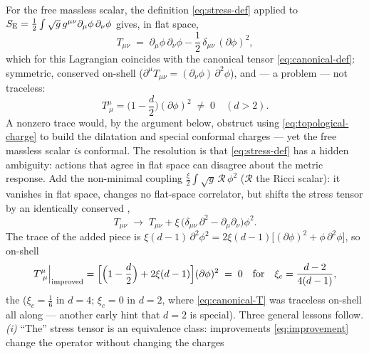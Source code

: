 \begin{eexample}
\label{ex:scalar-stress}
For the free massless scalar, the definition \eqref{eq:stress-def} applied to
$S_{\rm E} = \frac12\int \sqrt g\, g^{\mu\nu}\partial_\mu\phi\,\partial_\nu\phi$
gives, in flat space,
\begin{equation}
T_{\mu\nu} \;=\; \partial_\mu \phi\, \partial_\nu \phi
- \frac{1}{2}\,\delta_{\mu\nu}\, (\partial\phi)^2 ,
\label{eq:canonical-T}
\end{equation}
which for this Lagrangian coincides with the canonical tensor
\eqref{eq:canonical-def}: symmetric,
conserved on-shell ($\partial^\mu T_{\mu\nu} = (\partial_\nu \phi)\,
\partial^2\phi$), and --- a problem --- not traceless:
\begin{equation}
T^{\mu}_{\ \mu} = \Big(1 - \frac d2\Big)(\partial\phi)^2 \;\ne\; 0
\quad (d > 2).
\end{equation}
A nonzero trace would, by the argument below, obstruct using
\eqref{eq:topological-charge} to build the dilatation and special conformal
charges --- yet the free massless scalar \emph{is} conformal. The resolution
is that \eqref{eq:stress-def} has a hidden ambiguity: actions that agree in
flat space can disagree about the metric response. Add the non-minimal
coupling $\frac{\xi}{2} \int \sqrt g \, \mathcal{R}\, \phi^2$ ($\mathcal{R}$
the Ricci scalar): it vanishes in flat space, changes no flat-space
correlator, but shifts the stress tensor by an identically conserved
,
\begin{equation}
T_{\mu\nu} \;\longrightarrow\; T_{\mu\nu}
+ \xi \,\big(\delta_{\mu\nu}\,\partial^2 - \partial_\mu \partial_\nu\big)\phi^2 .
\label{eq:improvement}
\end{equation}
The trace of the added piece is $\xi(d-1)\,\partial^2\phi^2 =
2\xi(d-1)\big[(\partial\phi)^2 + \phi\,\partial^2\phi\big]$, so on-shell
\begin{equation}
T^{\mu}_{\ \mu}\Big|_{\rm improved}
= \Big[\Big(1 - \frac d2\Big) + 2\xi(d-1)\Big](\partial\phi)^2
\;=\; 0
\quad\text{for}\quad
\xi_c = \frac{d-2}{4(d-1)} ,
\label{eq:conformal-coupling}
\end{equation}
the  ($\xi_c = \frac16$ in $d = 4$; $\xi_c = 0$ in
$d=2$, where \eqref{eq:canonical-T} was traceless on-shell all along ---
another early hint that $d=2$ is special). Three general lessons follow.
\emph{(i)}
``The'' stress tensor is an equivalence class: improvements
\eqref{eq:improvement} change the operator without changing the charges

\end{eexample}
